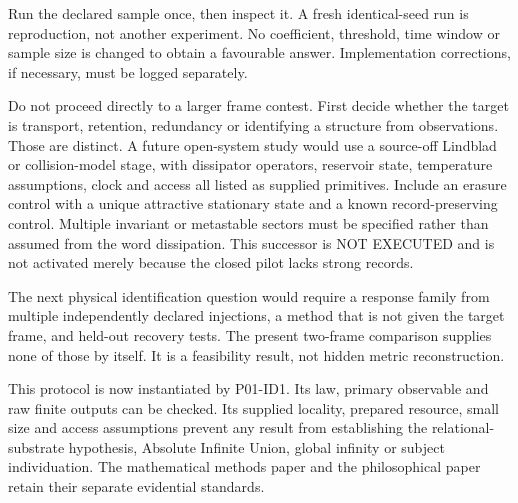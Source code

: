 \documentclass[
  10pt,
  a4paper,
]{article}
\makeatletter
\renewcommand\subsection{\@startsection{subsection}{2}{\z@}{-2ex \@plus -.8ex \@minus -.2ex}{.9ex \@plus .2ex}{\normalfont\large\bfseries}}
\makeatother
\begin{document}
Run the declared sample once, then inspect it. A fresh identical-seed
run is reproduction, not another experiment. No coefficient, threshold,
time window or sample size is changed to obtain a favourable answer.
Implementation corrections, if necessary, must be logged separately.

Do not proceed directly to a larger frame contest. First decide whether
the target is transport, retention, redundancy or identifying a
structure from observations. Those are distinct. A future open-system
study would use a source-off Lindblad or collision-model stage, with
dissipator operators, reservoir state, temperature assumptions, clock
and access all listed as supplied primitives. Include an erasure control
with a unique attractive stationary state and a known record-preserving
control. Multiple invariant or metastable sectors must be specified
rather than assumed from the word dissipation. This successor is NOT
EXECUTED and is not activated merely because the closed pilot lacks
strong records.

The next physical identification question would require a response
family from multiple independently declared injections, a method that is
not given the target frame, and held-out recovery tests. The present
two-frame comparison supplies none of those by itself. It is a
feasibility result, not hidden metric reconstruction.

\subsection{7. Evidence boundary}\label{evidence-boundary}

This protocol is now instantiated by P01-ID1. Its law, primary
observable and raw finite outputs can be checked. Its supplied locality,
prepared resource, small size and access assumptions prevent any result
from establishing the relational-substrate hypothesis, Absolute Infinite
Union, global infinity or subject individuation. The mathematical
methods paper and the philosophical paper retain their separate
evidential standards.
\end{document}

